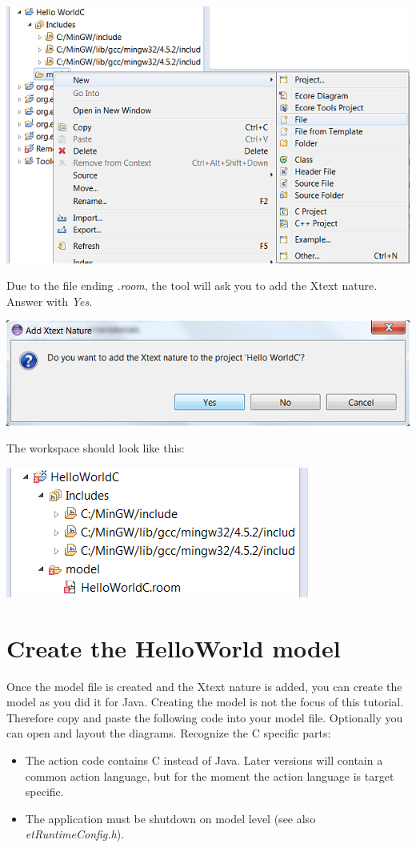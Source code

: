 \includegraphics{images/034-HelloWorldC03.png}

Due to the file ending \textit{.room}, the tool will ask you to add the Xtext nature. Answer with \textit{Yes}. 

\includegraphics{images/034-HelloWorldC04.png}

The workspace should look like this:

\includegraphics{images/034-HelloWorldC05.png}



\section{Create the HelloWorld model}

Once the model file is created and the Xtext nature is added, you can create the model as you did it for Java.
Creating the model is not the focus of this tutorial. Therefore copy and paste the following code into your model file. Optionally you can open and layout the diagrams.  
Recognize the C specific parts:
\begin{itemize}
\item The action code contains C instead of Java. Later versions will contain a common action language, but for the moment the action language is target specific.
\item The application must be shutdown on model level (see also \textit{etRuntimeConfig.h}).  
\end{itemize}

